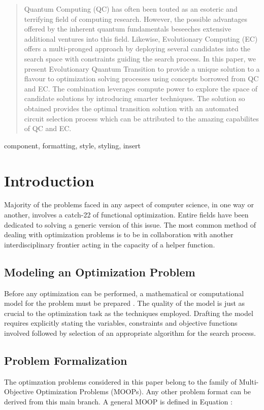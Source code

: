 \documentclass[conference]{IEEEtran}
\begin{document}
\begin{abstract}
Quantum Computing (QC) has often been touted as an esoteric and terrifying field of computing research. However, the possible advantages offered by the inherent quantum fundamentals beseeches extensive additional ventures into this field. Likewise, Evolutionary Computing (EC) offers a multi-pronged approach by deploying several candidates into the search space with constraints guiding the search process. In this paper, we present Evolutionary Quantum Transition to provide a unique solution to a flavour to optimization solving processes using concepts borrowed from QC and EC. The combination leverages compute power to explore the space of candidate solutions by introducing smarter techniques. The solution so obtained provides the optimal transition solution with an automated circuit selection process which can be attributed to the amazing capabilites of QC and EC. 
\end{abstract}

\begin{IEEEkeywords}
component, formatting, style, styling, insert
\end{IEEEkeywords}

\section{Introduction}

Majority of the problems faced in any aspect of computer science, in one way or another, involves a catch-22 of functional optimization. Entire fields have been dedicated to solving a generic version of this issue. The most common method of dealing with optimization problems is to be in collaboration with another interdisciplinary frontier acting in the capacity of a helper function. 

\subsection{Modeling an Optimization Problem}
Before any optimization can be performed, a mathematical or computational model for the problem must be prepared \cite{hara}. The quality of the model is just as crucial to the optimization task as the techniques employed. Drafting the model requires explicitly stating the variables, constraints and objective functions involved followed by selection of an appropriate algorithm for the search process. 

\subsection{Problem Formalization}
The optimzation problems considered in this paper belong to the family of Multi-Objective Optimization Problems (MOOPs)\cite{mul}. Any other problem format can be derived from this main branch. A general MOOP is defined in Equation :
\end{document}

